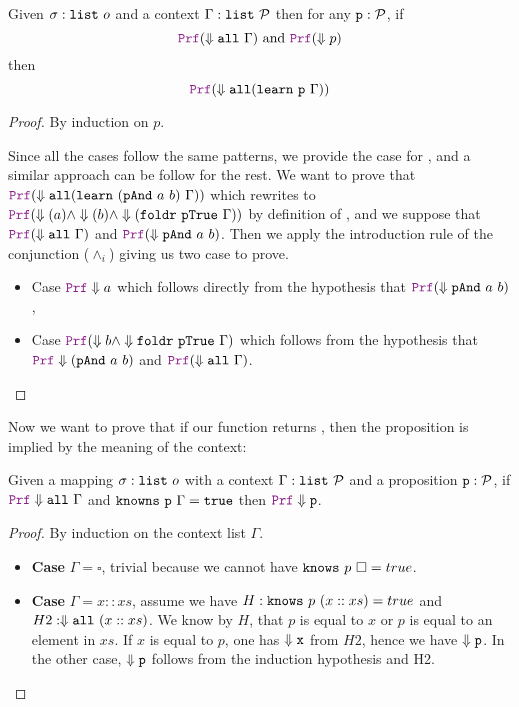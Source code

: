 \begin{lemma}\label{lemma:learning_sound}
Given $\sigma: \texttt{list}~o$ and a context $\Gamma: \texttt{list}~\mathcal{P}$ then for any $\texttt{\upshape{p}}: \mathcal{P}$, if
\[
  \prf (\deno{\kw{all}~\hyps}) \text{ and } \prf (\deno{p})
\]
then
\[
  \prf (\deno{\kw{all} (\kw{learn}~\kw{p}~\hyps)})
\]
\end{lemma}
\begin{proof} By induction on $p$.

Since all the cases follow the same patterns, we provide the case for , and a similar approach can be follow for the rest.
We want to prove that $\prf (\deno{\kw{all} (\kw{learn}~(\kw{pAnd}~a~b)~\hyps))}$ which rewrites to $\prf (\deno{(a)} \land \deno{(b)} \land \deno{(\kw{foldr}~\kw{pTrue}~\Gamma))}$ by definition of ,
and we suppose that $\prf (\deno{\kw{all}~\hyps})$ and $\prf (\deno{\kw{pAnd}~a~b)}$.
Then we apply the introduction rule of the conjunction ($\land_i$) giving us two case to prove.
\begin{itemize}
\item Case $\prf \deno{a}$ which follows directly from the hypothesis that $\prf (\deno{\kw{pAnd}~a~b)}$,
\item Case $\prf (\deno{b} \land \deno{\kw{foldr}~\kw{pTrue}~\Gamma)}$ which follows from the hypothesis that $\prf \deno{(\kw{pAnd}~a~b)}$ and $\prf (\deno{\kw{all}~\hyps})$.
\end{itemize}
\end{proof}

Now we want to prove that if our function  returns , then the proposition is implied by the meaning of the context:

\smallskip

\begin{lemma} \label{lemma:know_correct}
Given a mapping $\sigma: \texttt{list}~o$ with a context $\Gamma: \texttt{list}~\mathcal{P}$ and a proposition $\texttt{\upshape{p}}: \mathcal{P}$, if
$\prf \deno{\kw{all}~\Gamma}$ and $\texttt{\upshape{knowns}}~\texttt{\upshape{p}}~\Gamma = \texttt{\upshape{true}}$ then $\prf \deno{\kw{p}}$.
\end{lemma}
\begin{proof}
By induction on the context list $\Gamma$.
\begin{itemize}
\item[] \textbf{Case} $\Gamma = \square$, trivial because we cannot have $\texttt{\upshape{knows}}~p~\square = true$.
\item[] \textbf{Case} $\Gamma = x :: xs $, assume we have $H: \texttt{\upshape{knows}}~p~(x::xs) = true$ and $H2: \Downarrow \texttt{\upshape{all}}~(x::xs)$.
We know by $H$, that $p$ is equal to $x$ or $p$ is equal to an element in $xs$. If $x$ is equal to $p$, one has $\Downarrow \texttt{\upshape{x}}$ from $H2$, hence we have $\Downarrow \texttt{\upshape{p}}$.
In the other case, $\Downarrow \texttt{\upshape{p}}$ follows from the induction hypothesis and H2.
\end{itemize}
\end{proof}


